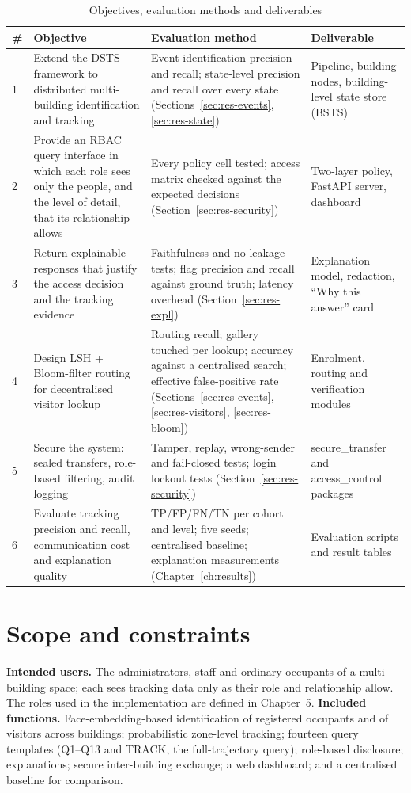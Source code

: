 \documentclass[12pt,a4paper,oneside]{report}
\begin{document}
\begin{table}[htbp]
\centering
\caption{Objectives, evaluation methods and deliverables}\label{tab:objectives}
{\small\setlength{\tabcolsep}{4pt}\renewcommand{\arraystretch}{1.2}
\begin{tabular}{|p{0.6cm}|p{4.4cm}|p{5.2cm}|p{3.6cm}|}\hline
\textbf{\#} & \textbf{Objective} & \textbf{Evaluation method} & \textbf{Deliverable}\\\hline
1 & Extend the DSTS framework to distributed multi-building identification and tracking & Event identification precision and recall; state-level precision and recall over every state (Sections~\ref{sec:res-events}, \ref{sec:res-state}) & Pipeline, building nodes, building-level state store (BSTS)\\\hline
2 & Provide an RBAC query interface in which each role sees only the people, and the level of detail, that its relationship allows & Every policy cell tested; access matrix checked against the expected decisions (Section~\ref{sec:res-security}) & Two-layer policy, FastAPI server, dashboard\\\hline
3 & Return explainable responses that justify the access decision and the tracking evidence & Faithfulness and no-leakage tests; flag precision and recall against ground truth; latency overhead (Section~\ref{sec:res-expl}) & Explanation model, redaction, ``Why this answer'' card\\\hline
4 & Design LSH + Bloom-filter routing for decentralised visitor lookup & Routing recall; gallery touched per lookup; accuracy against a centralised search; effective false-positive rate (Sections~\ref{sec:res-events}, \ref{sec:res-visitors}, \ref{sec:res-bloom}) & Enrolment, routing and verification modules\\\hline
5 & Secure the system: sealed transfers, role-based filtering, audit logging & Tamper, replay, wrong-sender and fail-closed tests; login lockout tests (Section~\ref{sec:res-security}) & secure\_\allowbreak transfer and access\_\allowbreak control packages\\\hline
6 & Evaluate tracking precision and recall, communication cost and explanation quality & TP/FP/FN/TN per cohort and level; five seeds; centralised baseline; explanation measurements (Chapter~\ref{ch:results}) & Evaluation scripts and result tables\\\hline
\end{tabular}}
\end{table}

\section{Scope and constraints}
\textbf{Intended users.} The administrators, staff and ordinary occupants of a multi-building space; each sees tracking data only as their role and relationship allow. The roles used in the implementation are defined in Chapter~5. \textbf{Included functions.} Face-embedding-based identification of registered occupants and of visitors across buildings; probabilistic zone-level tracking; fourteen query templates (Q1--Q13 and TRACK, the full-trajectory query); role-based disclosure; explanations; secure inter-building exchange; a web dashboard; and a centralised baseline for comparison.
\end{document}
